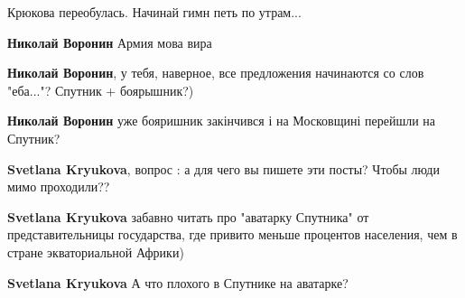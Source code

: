 \begin{itemize}
\begin{itemize}
Крюкова переобулась. Начинай гимн петь по утрам...

 
\textbf{Николай Воронин} Армия мова вира

 
\textbf{Николай Воронин}, у тебя, наверное, все предложения начинаются со слов "еба..."? Спутник + боярышник?)

 

\textbf{Николай Воронин} уже бояришник закінчився і на Московщині перейшли на Спутник?

 
\textbf{Svetlana Kryukova}, вопрос : а для чего вы пишете эти посты? Чтобы люди мимо проходили??

 
\textbf{Svetlana Kryukova} забавно читать про "аватарку Спутника" от представительницы государства, где привито меньше процентов населения, чем в стране экваториальной Африки)

 
\textbf{Svetlana Kryukova} А что плохого в Спутнике на аватарке?

 

\end{itemize}
\end{itemize}
